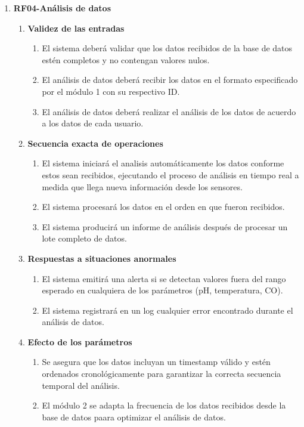 \begin{enumerate}
\item \label{it:RF04} \textbf{RF04-Análisis de datos}
        \begin{enumerate}
            \item \textbf{Validez de las entradas}
                \begin{enumerate}
                    \item El sistema deberá validar que los datos recibidos de la base de datos estén completos y no contengan valores nulos.
                    \item El análisis de datos deberá recibir los datos en el formato especificado por el módulo 1 con su respectivo ID.
                    \item El análisis de datos deberá realizar el análisis de los datos de acuerdo a los datos de cada usuario.   
                \end{enumerate}   
            
            \item \textbf{Secuencia exacta de operaciones}
                \begin{enumerate}
                    \item El sistema iniciará el analisis automáticamente los datos conforme estos sean recibidos, ejecutando el proceso de análisis en tiempo real a medida que llega nueva información desde los sensores.
                    \item El sistema procesará los datos en el orden en que fueron recibidos.
                    \item El sistema producirá un informe de análisis después de procesar un lote completo de datos.
                \end{enumerate}   
        
            \item \textbf{Respuestas a situaciones anormales}
                \begin{enumerate}
                    \item El sistema emitirá una alerta si se detectan valores fuera del rango esperado en cualquiera de los parámetros (pH, temperatura, CO).
                    \item El sistema registrará en un log cualquier error encontrado durante el análisis de datos.
                \end{enumerate}   
       
            \item \textbf{Efecto de los parámetros}
                \begin{enumerate}
                    \item Se asegura que los datos incluyan un timestamp válido y estén ordenados cronológicamente para garantizar la correcta secuencia temporal del análisis.
                    \item El módulo 2 se adapta la frecuencia de los datos recibidos desde la base de datos paara optimizar
                    el análisis de datos.
                \end{enumerate}   
        

\end{enumerate}
\end{enumerate}
